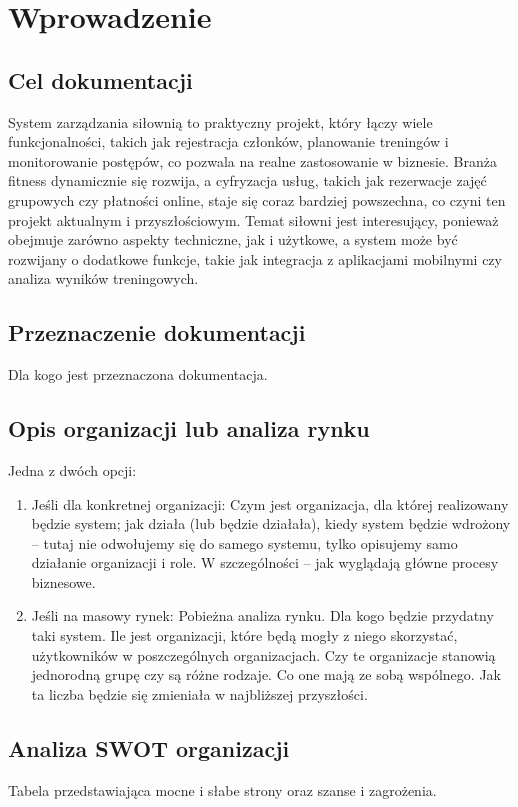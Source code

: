 \documentclass[a4paper,12pt]{article}
\begin{document}
\newpage

\section{Wprowadzenie}
\subsection{Cel dokumentacji}
System zarządzania siłownią to praktyczny projekt, który łączy wiele funkcjonalności, takich jak rejestracja członków, planowanie treningów i monitorowanie postępów, co pozwala na realne zastosowanie w biznesie. Branża fitness dynamicznie się rozwija, a cyfryzacja usług, takich jak rezerwacje zajęć grupowych czy płatności online, staje się coraz bardziej powszechna, co czyni ten projekt aktualnym i przyszłościowym. Temat siłowni jest interesujący, ponieważ obejmuje zarówno aspekty techniczne, jak i użytkowe, a system może być rozwijany o dodatkowe funkcje, takie jak integracja z aplikacjami mobilnymi czy analiza wyników treningowych.

\subsection{Przeznaczenie dokumentacji}
Dla kogo jest przeznaczona dokumentacja.

\subsection{Opis organizacji lub analiza rynku}
Jedna z dwóch opcji:

\begin{enumerate}
    \item Jeśli dla konkretnej organizacji: Czym jest organizacja, dla której realizowany będzie system; jak działa (lub będzie działała), kiedy system będzie wdrożony – tutaj nie odwołujemy się do samego systemu, tylko opisujemy samo działanie organizacji i role. W szczególności – jak wyglądają główne procesy biznesowe.
    \item Jeśli na masowy rynek: Pobieżna analiza rynku. Dla kogo będzie przydatny taki system. Ile jest organizacji, które będą mogły z niego skorzystać, użytkowników w poszczególnych organizacjach. Czy te organizacje stanowią jednorodną grupę czy są różne rodzaje. Co one mają ze sobą wspólnego. Jak ta liczba będzie się zmieniała w najbliższej przyszłości.
\end{enumerate}


\subsection{Analiza SWOT organizacji}
Tabela przedstawiająca mocne i słabe strony oraz szanse i zagrożenia.
\end{document}
